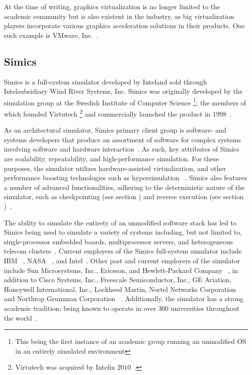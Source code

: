 At the time of writing, graphics virtualization is no longer limited to the academic community but is also existent in the industry, as big virtualization players incorporate various graphics acceleration solutions in their products.
One such example is VMware, Inc.~.


\subsection{Simics}
\label{sec:simics}
Simics is a full-system simulator developed by Intel\circledR and sold through Intel\circledR subsidiary Wind River Systems, Inc.
Simics was originally developed by the simulation group at the Swedish Institute of Computer Science \footnote{This being the first instance of an academic group running an unmodified OS in an entirely simulated environment}; the members of which founded Virtutech \footnote{Virtutech was acquired by Intel\circledR in $2010$~.} and commercially launched the product in $1998$~.

As an architectural simulator, Simics primary client group is software- and systems developers that produce an assortment of software for complex systems involving software and hardware interaction~.
As such, key attributes of Simics are scalability, repeatability, and high-performance simulation.
For these purposes, the simulator utilizes hardware-assisted virtualization, and other performance boosting technologies such as hypersimulation ~.
Simics also features a number of advanced functionalities, adhering to the deterministic nature of the simulator, such as checkpointing (see section ) and reverse execution (see section )~.

The ability to simulate the entirety of an unmodified software stack has led to Simics being used to simulate a variety of systems including, but not limited to, single-processor embedded boards, multiprocessor servers, and heterogeneous telecom clusters~.
Current employers of the Simics full-system simulator include IBM ~, NASA ~, and Intel\circledR ~.
Other past and current employers of the simulator include Sun Microsystems, Inc., Ericsson, and Hewlett-Packard Company ~, in addition to Cisco Systems, Inc., Freescale Semiconductor, Inc., GE Aviation, Honeywell International, Inc., Lockheed Martin, Nortel Networks Corporation and Northrop Grumman Corporation ~.
Additionally, the simulator has a strong academic tradition; being known to operate in over $300$ universities throughout the world~.

